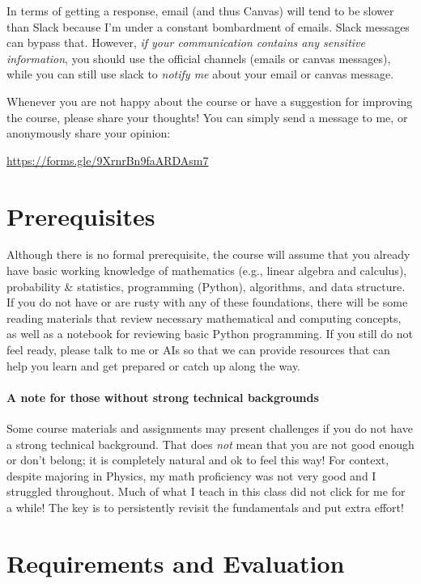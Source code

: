 \documentclass[11pt,article,oneside]{memoir} %
\begin{document}
In terms of getting a response, email (and thus Canvas) will tend to be slower than Slack because I'm under a constant bombardment of emails. Slack messages can bypass that. However, \emph{if your communication contains any sensitive information}, you should use the official channels (emails or canvas messages), while you can still use slack to \emph{notify me} about your email or canvas message. 

Whenever you are not happy about the course or have a suggestion for improving the course, please share your thoughts! You can simply send a message to me, or anonymously share your opinion:

\url{https://forms.gle/9XrnrBn9faARDAsm7}

\section{Prerequisites} %

Although there is no formal prerequisite, the course will assume that you already have basic working knowledge of mathematics (e.g., linear algebra and calculus), probability \& statistics, programming (Python), algorithms, and data structure. 
If you do not have or are rusty with any of these foundations, there will be some reading materials that review necessary mathematical and computing concepts, as well as a notebook for reviewing basic Python programming. 
If you still do not feel ready, please talk to me or AIs so that we can provide resources that can help you learn and get prepared or catch up along the way. 

\paragraph{A note for those without strong technical backgrounds} Some course materials and assignments may present challenges if you do not have a strong technical background.
That does \emph{not} mean that you are not good enough or don't belong; it is completely natural and ok to feel this way! For context, despite majoring in Physics, my math proficiency was not very good and I struggled throughout. Much of what I teach in this class did not click for me for a while! The key is to persistently revisit the fundamentals and  put extra effort!

\section{Requirements and Evaluation} %
\end{document}
